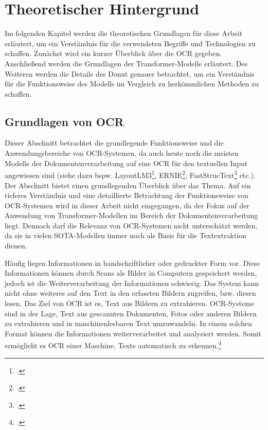\chapter{Theoretischer Hintergrund}
Im folgenden Kapitel werden die theoretischen Grundlagen für diese Arbeit erläutert, um ein Verständnis für die verwendeten Begriffe und Technologien zu schaffen. Zunächst wird ein kurzer Überblick über die \ac{OCR} gegeben. Anschließend werden die Grundlagen der Transformer-Modelle erläutert. Des Weiteren werden die Details des \ac{Donut} genauer betrachtet, um ein Verständnis für die Funktionsweise des Modells im Vergleich zu herkömmlichen Methoden zu schaffen.

\section{Grundlagen von OCR}
Dieser Abschnitt betrachtet die grundlegende Funktionsweise und die Anwendungsbereiche von OCR-Systemen, da auch heute noch die meisten Modelle der Dokumentenverarbeitung auf eine OCR für den textuellen Input angewiesen sind (siehe dazu bspw. LayoutLM3\footcites[Vgl. dazu ausführlich][]{huang_layoutlmv3_2022}, ERNIE\footcites[Vgl. dazu ausführlich][]{peng_ernie-layout_2022}, FastStrucText\footcites[Vgl. dazu ausführlich][]{zhai_fast-structext_2023} etc.). Der Abschnitt bietet einen grundlegenden Überblick über das Thema. Auf ein tieferes Verständnis und eine detaillierte Betrachtung der Funktionsweise von OCR-Systemen wird in dieser Arbeit nicht eingegangen, da der Fokus auf der Anwendung von Transformer-Modellen im Bereich der Dokumentenverarbeitung liegt. Dennoch darf die Relevanz von OCR-Systemen nicht unterschätzt werden, da sie in vielen \ac{SOTA}-Modellen immer noch als Basis für die Textextraktion dienen. 

Häufig liegen Informationen in handschriftlicher oder gedruckter Form vor. Diese Informationen können durch Scans als Bilder in Computern gespeichert werden, jedoch ist die Weiterverarbeitung der Informationen schwierig. Das System kann nicht ohne weiteres auf den Text in den erfassten Bildern zugreifen, bzw. diesen lesen. Das Ziel von OCR ist es, Text aus Bildern zu extrahieren. OCR-Systeme sind in der Lage, Text aus gescannten Dokumenten, Fotos oder anderen Bildern zu extrahieren und in maschinenlesbaren Text umzuwandeln. In einem solchen Format können die Informationen weiterverarbeitet und analysiert werden. Somit ermöglicht es OCR einer Maschine, Texte automatisch zu erkennen.\footcites[Vgl.][S. 244]{hamad_detailed_2016}

